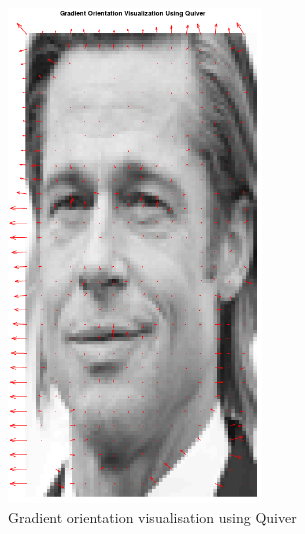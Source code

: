 \documentclass[a4paper]{article}
\begin{document}
\begin{minipage}{0.49\textwidth}
\begin{figure}[H]
    \centering
    \includegraphics[width=0.6\textwidth]{./images/2_2_gradient_orientation.png}
    \caption{Gradient orientation visualisation using Quiver}
\end{figure}
\end{minipage}
\hfill
\end{document}
